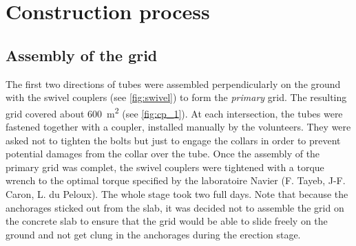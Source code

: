 

\pagebreak
\section{Construction process}\label{sec=construction_process}

\subsection{Assembly of the grid}
The first two directions of tubes were assembled perpendicularly on the ground with the swivel couplers (see \cref{fig:swivel}) to form the \emph{primary} grid. The resulting grid covered about 600~m\textsuperscript{2} (see \cref{fig:cp_1}). At each intersection, the tubes were fastened together with a coupler, installed manually by the volunteers. They were asked not to tighten the bolts but just to engage the collars in order to prevent potential damages from the collar over the tube. Once the assembly of the primary grid was complet, the swivel couplers were tightened with a torque wrench to the optimal torque specified by the laboratoire Navier (F. Tayeb, J-F. Caron, L. du Peloux). The whole stage took two full days. Note that because the anchorages sticked out from the slab, it was decided not to assemble the grid on the concrete slab to ensure that the grid would be able to slide freely on the ground and not get clung in the anchorages during the erection stage.

